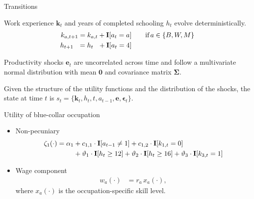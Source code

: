 \begin{frame}{Transitions}\vspace{0.25cm}

  Work experience $\bm{k}_t$  and years of completed schooling $h_t$ evolve deterministically.
  \begin{align*}
  k_{a,t+1} = k_{a,t} + {\textbf{I}}[a_t = a]  &\qquad \text{if}\, a \in \{B, W, M\} \\
  h_{t + 1\phantom{,a}} = h_{t\phantom{,a}} +   {\textbf{I}}[a_t = 4]  &\qquad
  \end{align*}

Productivity shocks $\bm{e}_t$ are uncorrelated across time and follow a multivariate normal distribution with mean $\bm{0}$ and covariance matrix $\bm{\Sigma}$.

Given the structure of the utility functions and the distribution of the shocks, the state at time $t$ is $s_t = \{\bm{k}_t, h_t, t, a_{t -1}, \bm{e},\bm{\epsilon}_t\}$.

\end{frame}
\begin{frame}{Utility of blue-collar occupation}\vspace{0.25cm}

	\begin{itemize}\setlength\itemsep{1em}
	\item Non-pecuniary
  \begin{align*}
  \zeta_{1}(\cdot)  = \alpha_1 & + c_{1,1} \cdot {\textbf{I}}[a_{t-1} \neq 1] + c_{1,2} \cdot {\textbf{I}}[k_{1,t} = 0] \\
                              & + \vartheta_1 \cdot {\textbf{I}}[h_t \geq 12] + \vartheta_2 \cdot {\textbf{I}}[h_t \geq 16] + \vartheta_3 \cdot {\textbf{I}}[k_{3,t} = 1]
  \end{align*}

	 \item Wage component
	 \begin{align*}
	 w_{a}(\cdot) & = r_{a} \, x_{a}(\cdot),
	 \end{align*}
where  $x_{a}(\cdot)$ is the occupation-specific skill level.
 \end{itemize}
\end{frame}
